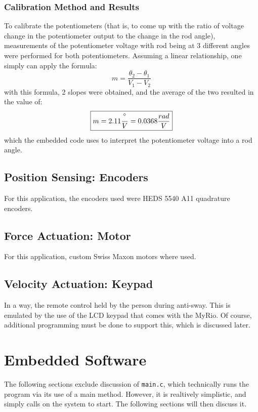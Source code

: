 \documentclass[letterpaper]{article}
\begin{document}
\subsubsection{Calibration Method and Results}
To calibrate the potentiometers (that is, to come up with the ratio of voltage change in the potentiometer output to the change in the rod angle), measurements of the potentiometer voltage with rod being at 3 different angles were performed for both potentiometers. Assuming a linear relationship, one simply can apply the formula:
$$m=\frac{\theta_2-\theta_1}{V_1-V_2}$$
with this formula, 2 slopes were obtained, and the average of the two resulted in the value of:
$$\boxed{m=2.11 \frac{\degree}{V} = 0.0368 \frac{rad}{V}}$$
which the embedded code uses to interpret the potentiometer voltage into a rod angle.
\subsection{Position Sensing: Encoders}
For this application, the encoders used were HEDS 5540 A11 quadrature encoders.
\subsection{Force Actuation: Motor}
For this application, custom Swiss Maxon motors where used.
\subsection{Velocity Actuation: Keypad}
In a way, the remote control held by the person during anti-sway. This is emulated by the use of the LCD keypad that comes with the MyRio. Of course, additional programming must be done to support this, which is discussed later.

\newpage

\section{Embedded Software} \label{section-emb-soft}
The following sections exclude discussion of \texttt{main.c}, which technically runs the program via its use of a main method. However, it is realtively simplistic, and simply calls on the system to start. The following sections will then discuss it.
\end{document}
